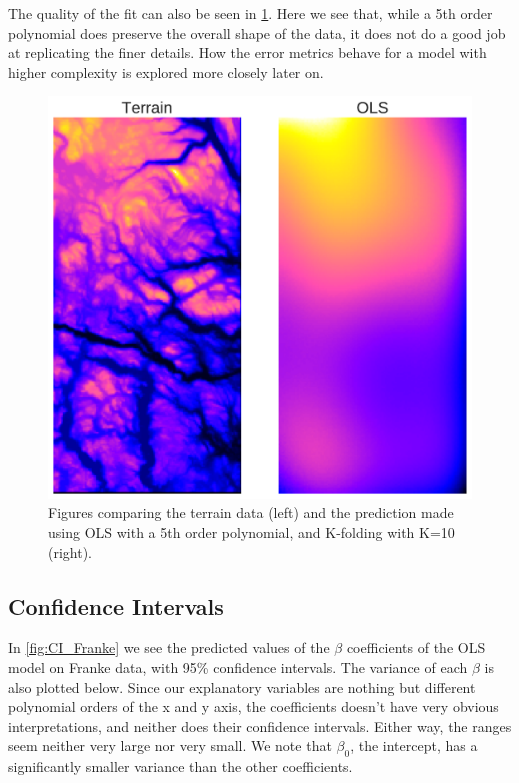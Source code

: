 \documentclass[10pt, twocolumn]{article}
\begin{document}
The quality of the fit can also be seen in \cref{fig:terrain_ols}. Here we see that, while a 5th order polynomial does preserve the overall shape of the data, it does not do a good job at replicating the finer details. How the error metrics behave for a model with higher complexity is explored more closely later on. 

\begin{figure}[h!]
    \centering
    \includegraphics[scale=0.4]{../figs/terrain_vs_ols.pdf}
    \caption{Figures comparing the terrain data (left) and the prediction made using OLS with a 5th order polynomial, and K-folding  with K=10 (right).}
    \label{fig:terrain_ols}
\end{figure}

\subsection{Confidence Intervals}
In \cref{fig:CI_Franke} we see the predicted values of the $\beta$ coefficients of the OLS model on Franke data, with 95\% confidence intervals. The variance of each $\beta$ is also plotted below. Since our explanatory variables are nothing but different polynomial orders of the x and y axis, the coefficients doesn't have very obvious interpretations, and neither does their confidence intervals. Either way, the ranges seem neither very large nor very small. We note that $\beta_0$, the intercept, has a significantly smaller variance than the other coefficients.
\end{document}
